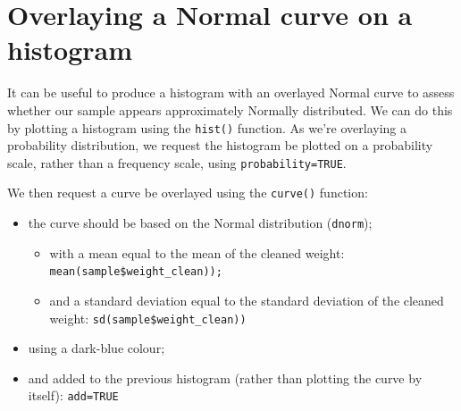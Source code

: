 \documentclass[
]{memoir}
\newenvironment{Shaded}{\begin{snugshade}}{\end{snugshade}}
\newcommand{\AttributeTok}[1]{\textcolor[rgb]{0.77,0.63,0.00}{#1}}
\newcommand{\ConstantTok}[1]{\textcolor[rgb]{0.00,0.00,0.00}{#1}}
\newcommand{\FunctionTok}[1]{\textcolor[rgb]{0.00,0.00,0.00}{#1}}
\newcommand{\NormalTok}[1]{#1}
\newcommand{\SpecialCharTok}[1]{\textcolor[rgb]{0.00,0.00,0.00}{#1}}
\newcommand{\StringTok}[1]{\textcolor[rgb]{0.31,0.60,0.02}{#1}}
\begin{document}
\hypertarget{overlaying-a-normal-curve-on-a-histogram}{%
\section{Overlaying a Normal curve on a histogram}\label{overlaying-a-normal-curve-on-a-histogram}}

It can be useful to produce a histogram with an overlayed Normal curve to assess whether our sample appears approximately Normally distributed. We can do this by plotting a histogram using the \texttt{hist()} function. As we're overlaying a probability distribution, we request the histogram be plotted on a probability scale, rather than a frequency scale, using \texttt{probability=TRUE}.

We then request a curve be overlayed using the \texttt{curve()} function:

\begin{itemize}
\item
  the curve should be based on the Normal distribution (\texttt{dnorm});

  \begin{itemize}
  \item
    with a mean equal to the mean of the cleaned weight: \texttt{mean(sample\$weight\_clean));}
  \item
    and a standard deviation equal to the standard deviation of the cleaned weight: \texttt{sd(sample\$weight\_clean))}
  \end{itemize}
\item
  using a dark-blue colour;
\item
  and added to the previous histogram (rather than plotting the curve by itself): \texttt{add=TRUE}
\end{itemize}

\begin{Shaded}
\end{Shaded}
\end{document}

